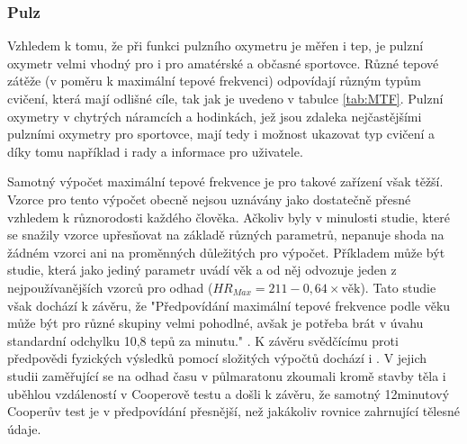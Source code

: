 \subsubsection {Pulz}
Vzhledem k tomu, že při funkci pulzního oxymetru je měřen i tep, je pulzní oxymetr velmi vhodný pro i pro amatérské a občasné sportovce. Různé tepové zátěže (v poměru k maximální tepové frekvenci) odpovídají různým typům cvičení, která mají odlišné cíle, tak jak je uvedeno v tabulce \ref{tab:MTF}. Pulzní oxymetry v chytrých náramcích a hodinkách, jež jsou zdaleka nejčastějšími pulzními oxymetry pro sportovce, mají tedy i možnost ukazovat typ cvičení a díky tomu například i rady a informace pro uživatele.
\par Samotný výpočet maximální tepové frekvence je pro takové zařízení však těžší. Vzorce pro tento výpočet obecně nejsou uznávány jako dostatečně přesné vzhledem k různorodosti každého člověka. Ačkoliv byly v minulosti studie, které se snažily vzorce upřesňovat na základě různých parametrů, nepanuje shoda na žádném vzorci ani na proměnných důležitých pro výpočet. Příkladem může být studie, která jako jediný parametr uvádí věk a od něj odvozuje jeden z nejpoužívanějších vzorců pro odhad ($HR_{Max}=211-0,64\times\text{věk}$). Tato studie však dochází k závěru, že "Předpovídání maximální tepové frekvence podle věku může být pro různé skupiny velmi pohodlné, avšak je potřeba brát v úvahu standardní odchylku 10,8 tepů za minutu." \citep{maxHR}. K závěru svědčícímu proti předpovědi fyzických výsledků pomocí složitých výpočtů dochází i \cite{Cooper}. V jejich studii zaměřující se na odhad času v půlmaratonu zkoumali kromě stavby těla i  uběhlou vzdáleností v Cooperově testu a došli k závěru, že samotný 12minutový Cooperův test je v předpovídání přesnější, než jakákoliv rovnice zahrnující tělesné údaje.
